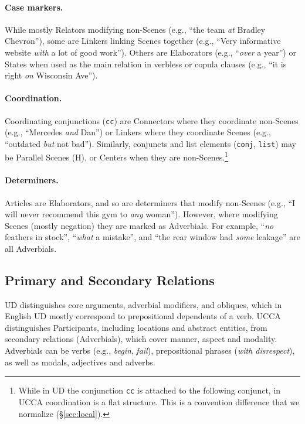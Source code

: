 \documentclass[11pt,a4paper]{article}
\begin{document}
\paragraph{Case markers.}
      While mostly Relators
      modifying non-Scenes (e.g., ``the team \textit{at} Bradley Chevron''),
      some are Linkers linking Scenes together 
      (e.g., ``Very informative website \textit{with} a lot of good work'').
      Others are Elaborators (e.g., ``\textit{over} a year'') or States
      when used as the main relation in verbless or copula clauses
      (e.g., ``it is right \textit{on} Wisconsin Ave'').
    
\paragraph{Coordination.}
      Coordinating conjunctions (\texttt{cc}) are Connectors where they coordinate non-Scenes
      (e.g., ``Mercedes \textit{and} Dan'')
      or Linkers where they coordinate Scenes (e.g., ``outdated \textit{but} not bad'').
      Similarly, conjuncts and list elements (\texttt{conj}, \texttt{list}) may be Parallel Scenes (H),
      or Centers when they are non-Scenes.\footnote{While in UD 
      the conjunction \texttt{cc} is attached to the following conjunct,
      in UCCA coordination is a flat structure.
      This is a convention difference that we normalize (\S\ref{sec:local}).}

\paragraph{Determiners.}
      Articles are Elaborators, and so are determiners that modify non-Scenes 
      (e.g., ``I will never recommend this gym to \textit{any} woman'').
      However, where modifying Scenes (mostly negation)
      they are marked as Adverbials. For example, ``\textit{no} feathers in stock'', ``\textit{what} a mistake'',
      and ``the rear window had \textit{some} leakage'' are all Adverbials.



\subsection{Primary and Secondary Relations}\label{sec:arguments}

UD distinguishes core arguments, adverbial modifiers,
and obliques, which in English UD mostly correspond to prepositional dependents of a verb.
UCCA distinguishes Participants, including locations and abstract entities,
from secondary relations (Adverbials), 
which cover manner, aspect and modality.
Adverbials can be verbs (e.g., \textit{begin}, \textit{fail}),
prepositional phrases (\textit{with disrespect}),
as well as modals, adjectives and adverbs.
\end{document}
